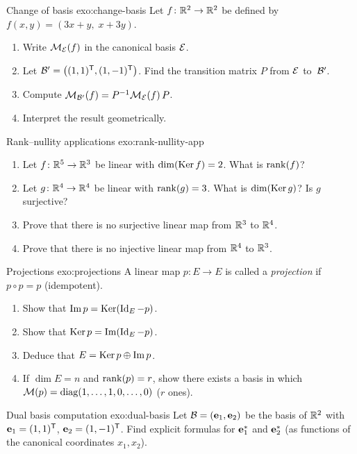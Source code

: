 \begin{exercise}{Change of basis \intermediate}{exo:change-basis}
Let $f\colon{\mathbb{R}}^2\to{\mathbb{R}}^2$ be defined by $f(x,y) = (3x+y,\; x+3y)$.
\begin{enumerate}[label=(\alph*)]
  \item Write $\mathcal{M}_{\mathcal{E}}(f)$ in the canonical basis ${\mathcal{E}}$.
  \item Let ${\mathcal{B}}' = \bigl((1,1)^{\mathsf{T}},(1,-1)^{\mathsf{T}}\bigr)$.
    Find the transition matrix $P$ from ${\mathcal{E}}$ to~${\mathcal{B}}'$.
  \item Compute $\mathcal{M}_{{\mathcal{B}}'}(f) = {P}^{-1}\mathcal{M}_{\mathcal{E}}(f)\,P$.
  \item Interpret the result geometrically.
\end{enumerate}
\end{exercise}

\begin{exercise}{Rank--nullity applications \intermediate}%
{exo:rank-nullity-app}
\begin{enumerate}[label=(\alph*)]
  \item Let $f\colon{\mathbb{R}}^5\to{\mathbb{R}}^3$ be linear with $\dim(\operatorname{Ker} f) = 2$.
    What is $\operatorname{rank}(f)$?
  \item Let $g\colon{\mathbb{R}}^4\to{\mathbb{R}}^4$ be linear with $\operatorname{rank}(g) = 3$.
    What is $\dim(\operatorname{Ker} g)$? Is $g$ surjective?
  \item Prove that there is no surjective linear map from ${\mathbb{R}}^3$ to ${\mathbb{R}}^4$.
  \item Prove that there is no injective linear map from ${\mathbb{R}}^4$ to ${\mathbb{R}}^3$.
\end{enumerate}
\end{exercise}

\begin{exercise}{Projections \intermediate}{exo:projections}
A linear map $p\colon E\to E$ is called a \emph{projection} if
$p\circ p = p$ (idempotent).
\begin{enumerate}[label=(\alph*)]
  \item Show that $\operatorname{Im} p = \operatorname{Ker}(\operatorname{Id}_E - p)$.
  \item Show that $\operatorname{Ker} p = \operatorname{Im}(\operatorname{Id}_E - p)$.
  \item Deduce that $E = \operatorname{Ker} p \oplus \operatorname{Im} p$.
  \item If $\dim E = n$ and $\operatorname{rank}(p) = r$, show there exists a basis
    in which $\mathcal{M}(p) = \operatorname{diag}(1,\ldots,1,0,\ldots,0)$ ($r$ ones).
\end{enumerate}
\end{exercise}

\begin{exercise}{Dual basis computation \intermediate}{exo:dual-basis}
Let ${\mathcal{B}} = (\mathbf{e}_{1},\mathbf{e}_{2})$ be the basis of ${\mathbb{R}}^2$ with
$\mathbf{e}_{1} = (1,1)^{\mathsf{T}}$, $\mathbf{e}_{2} = (1,-1)^{\mathsf{T}}$.
Find explicit formulas for $\mathbf{e}_{1}^*$ and $\mathbf{e}_{2}^*$ (as functions
of the canonical coordinates $x_1,x_2$).
\end{exercise}

